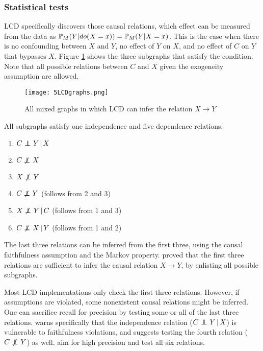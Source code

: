 \subsubsection{Statistical tests}

LCD specifically discovers those causal relations, which effect can be measured from the data as $\mathbb{P} _M(Y|do(X=x)) = \mathbb{P} _M(Y|X=x)$. This is the case when there is no confounding between $X$ and $Y$, no effect of $Y$ on $X$, and no effect of $C$ on $Y$ that bypasses $X$. Figure \ref{fig:5:lcdgraphs} shows the three subgraphs that satisfy the condition. Note that all possible relations between $C$ and $X$ given the exogeneity assumption are allowed.

\begin{figure}[h]
    \centering
    \texttt{[image: 5LCDgraphs.png]}
    \caption{All mixed graphs in which LCD can infer the relation $X\to Y$}
    \label{fig:5:lcdgraphs}
\end{figure}

All subgraphs satisfy one independence and five dependence relations:

\begin{enumerate}
    \item $C \operatorname*{{\,\perp\mkern-12mu\perp\,}} Y \,|\, X $
    \item $C \operatorname*{{\,\not\mkern-1mu\perp\mkern-12mu\perp\,}} X$
    \item $X \operatorname*{{\,\not\mkern-1mu\perp\mkern-12mu\perp\,}} Y$
    \item $C \operatorname*{{\,\not\mkern-1mu\perp\mkern-12mu\perp\,}} Y$ (follows from 2 and 3)
    \item $X \operatorname*{{\,\not\mkern-1mu\perp\mkern-12mu\perp\,}} Y \,|\, C$ (follows from 1 and 3)
    \item $C \operatorname*{{\,\not\mkern-1mu\perp\mkern-12mu\perp\,}} X \,|\, Y$ (follows from 1 and 2)
\end{enumerate}

The last three relations can be inferred from the first three, using the causal faithfulness assumption and the Markov property. \citet{cooper1997simple} proved that the first three relations are sufficient to infer the causal relation $X\to Y$, by enlisting all possible subgraphs. 

Most LCD implementations only check the first three relations. However, if assumptions are violated, some nonexistent causal relations might be inferred. One can sacrifice recall for precision by testing some or all of the last three relations. \citet{cooper1997simple} warns specifically that the independence relation ($C \operatorname*{{\,\perp\mkern-12mu\perp\,}} Y \,|\, X$) is vulnerable to faithfulness violations, and suggests testing the fourth relation ($C \operatorname*{{\,\not\mkern-1mu\perp\mkern-12mu\perp\,}} Y$) as well. \citet{triantafillou2017predicting} aim for high precision and test all six relations.

